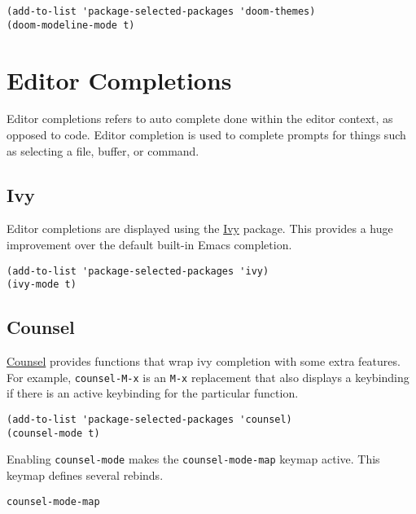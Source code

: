 \documentclass[11pt]{article}
\begin{document}
\begin{verbatim}
(add-to-list 'package-selected-packages 'doom-themes)
(doom-modeline-mode t)
\end{verbatim}
\section{Editor Completions}
\label{sec:org7a05584}

Editor completions refers to auto complete done within the editor context, as
opposed to code. Editor completion is used to complete prompts for things such
as selecting a file, buffer, or command.
\subsection{Ivy}
\label{sec:org4b59c39}

Editor completions are displayed using the \href{https://github.com/abo-abo/swiper?tab=readme-ov-file\#ivy}{Ivy} package. This provides a huge
improvement over the default built-in Emacs completion.

\begin{verbatim}
(add-to-list 'package-selected-packages 'ivy)
(ivy-mode t)
\end{verbatim}
\subsection{Counsel}
\label{sec:org8decf39}

\href{https://github.com/abo-abo/swiper?tab=readme-ov-file\#counsel}{Counsel} provides functions that wrap ivy completion with some extra
features. For example, \texttt{counsel-M-x} is an \texttt{M-x} replacement that also displays
a keybinding if there is an active keybinding for the particular function.

\begin{verbatim}
(add-to-list 'package-selected-packages 'counsel)
(counsel-mode t)
\end{verbatim}

Enabling \texttt{counsel-mode} makes the \texttt{counsel-mode-map} keymap active. This keymap
defines several rebinds.

\begin{verbatim}
counsel-mode-map
\end{verbatim}
\end{document}
